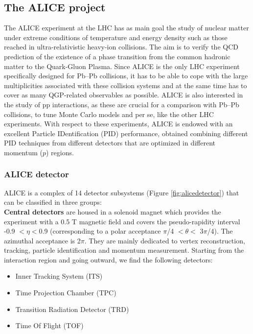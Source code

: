\subsection{The ALICE project}
The ALICE experiment at the LHC \cite{cite:ALICE} has as main goal the study of nuclear matter under extreme conditions of temperature and energy density such as those reached in ultra-relativistic heavy-ion collisions. The aim is to verify the QCD prediction of the existence of a phase transition from the common hadronic matter to the Quark-Gluon Plasma. Since ALICE is the only LHC experiment specifically designed for Pb--Pb collisions, it has to be able to cope with the large multiplicities associated with these collision systems and at the same time has to cover as many QGP-related observables as possible. ALICE is also interested in the study of pp interactions, as these are crucial for a comparison with Pb--Pb collisions, to tune Monte Carlo models and per se, like the other LHC experiments. With respect to these experiments, ALICE is endowed with an excellent Particle IDentification (PID) performance, obtained combining different PID techniques from different detectors that are optimized in different momentum ($\ensuremath{p}$) regions.

\subsubsection{ALICE detector}\label{label:alice}
ALICE is a complex of 14 detector subsystems (Figure \ref{fig:alicedetector}) that can be classified in three groups: \\

\textbf{Central detectors} are housed in a solenoid magnet which provides the experiment with a 0.5 T magnetic field and covers the pseudo-rapidity interval -0.9 $< \eta <$0.9 (corresponding to a polar acceptance $\pi$/4 $< \theta <$ 3$\pi$/4). The azimuthal   acceptance is 2$\pi$. They are mainly dedicated to vertex reconstruction, tracking, particle identification and momentum measurement. Starting from the interaction region and going outward, we find the following detectors: 
\begin{itemize}
\item Inner Tracking System (ITS)
\item Time Projection Chamber (TPC)
\item Transition Radiation Detector (TRD)
\item Time Of Flight (TOF)
\end{itemize}


